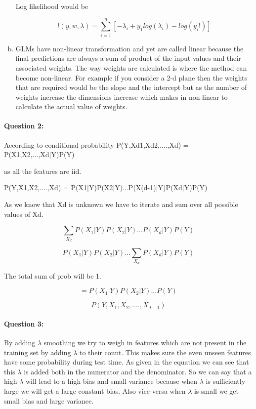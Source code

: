 \documentclass[letterpaper,11pt]{article}
\begin{document}
\begin{enumerate}[(a)]
Log likelihood would be

\[
	l(y,w,\lambda) = \sum_{i=1}^{n}[-\lambda_i + y_1log(\lambda_i) - log(y_i!)]
\]




\bigskip
\item

GLMs have non-linear transformation and yet are called linear because the final predictions are always a sum of product of the input values and their associated weights. The way weights are calculated is where the method can become non-linear. For example if you consider a 2-d plane then the weights that are required would be the slope and the intercept but as the number of weights increase the dimensions increase which makes in non-linear to calculate the actual value of weights.

\end{enumerate}

\paragraph{Question 2:}

According to conditional probability  \newline
P(Y,Xd1,Xd2,....,Xd) = P(X1,X2,...,Xd|Y)P(Y)

as all the features are iid.
\newline \newline

P(Y,X1,X2,....,Xd) = P(X1|Y)P(X2|Y)...P(X(d-1)|Y)P(Xd|Y)P(Y)

As we know that Xd is unknown we have to iterate and sum over all possible values of Xd.

\[
	\sum_{X_d} P(X_1|Y)P(X_2|Y)...P(X_d|Y)P(Y)
\]

\[
	P(X_1|Y)P(X_2|Y)...\sum_{X_d}P(X_d|Y)P(Y)
\]

The total sum of prob will be 1.

\[
	=P(X_1|Y)P(X_2|Y)...P(Y)
\]

\[
	P(Y,X_1,X_2,....,X_{d-1})
\]


\paragraph{Question 3:}

By adding $\lambda$ smoothing we try to weigh in features which are not present in the training set by adding $\lambda$ to their count. This makes sure the even unseen features have some probability during test time. As given in the equation we can see that this $\lambda$ is added both in the numerator and the denominator. So we can say that a high $\lambda$ will lead to a high bias and small variance because when $\lambda$ is sufficiently large we will get a large constant bias. Also vice-versa when $\lambda$ is small we get small bias and large variance.
\end{document}
